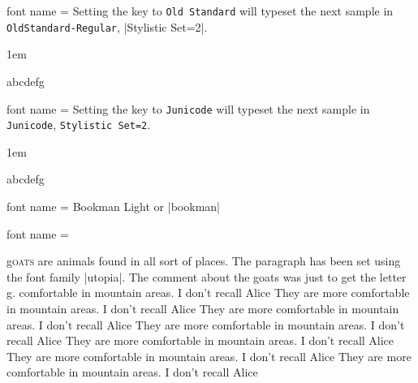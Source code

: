 \begin{docKey}[phd] {font name}{ = } {}
Setting the key to \texttt{Old Standard} will typeset the next sample in \texttt{OldStandard-Regular}, |Stylistic Set=2|. 

\bgroup
\parindent1em\itshape
^^A

\aliceii

abcdefg
\egroup
\end{docKey}

\begin{docKey}[phd]{font name}{ = } {}
Setting the key to \texttt{Junicode} will typeset the next sample in \texttt{Junicode}, \texttt{Stylistic Set=2}. 

\bgroup
\parindent1em\itshape
{}

\aliceii

abcdefg
\egroup
\end{docKey}




\begin{docKey}[phd] {font name }{=} {}
Bookman Light or |bookman|
\end{docKey}

\bgroup
{}
\aliceiii
\egroup


\begin{docKey}[phd] {font name }{ =} {}

\end{docKey}

\bgroup
{}

\renewcommand{\LettrineFontHook}{\fontfamily{put}\fontseries{bx}}%
\par\leavevmode

\lettrine[lines=5, lhang=0.1,lraise=0.28,findent=1pt]{g}{oats} are animals found in all sort of places. The paragraph has been set using the font family |utopia|. The comment about the goats was just to get the letter g.
comfortable in mountain areas. I don't recall Alice  They are more
comfortable in mountain areas. I don't recall Alice  They are more
comfortable in mountain areas. I don't recall Alice  They are more
comfortable in mountain areas. I don't recall Alice  They are more
comfortable in mountain areas. I don't recall Alice  They are more
comfortable in mountain areas. I don't recall Alice  They are more
comfortable in mountain areas. I don't recall Alice 


\renewcommand{\LettrineFontHook}{\fontfamily{phv}\fontseries{bx}}%



